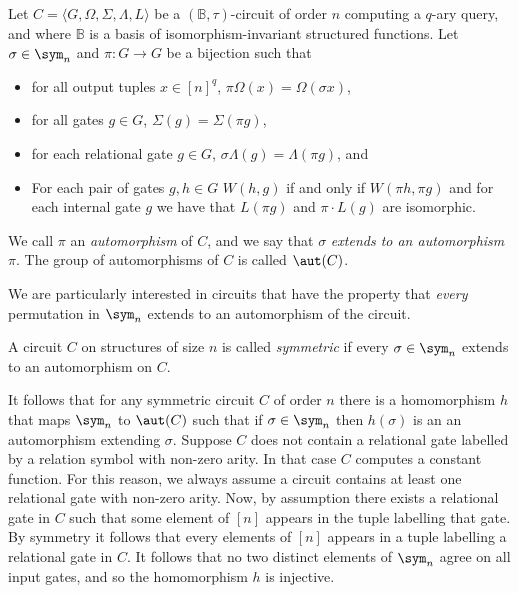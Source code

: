 \documentclass[a4paper,UKenglish]{lipics-v2018}
\begin{document}
\begin{definition}[Automorphism]\label{defn:automorphism}
  Let $C = \langle G, \Omega, \Sigma, \Lambda, L\rangle$ be a
  $(\mathbb{B},\tau)$-circuit of order $n$ computing a $q$-ary query, and where
  $\mathbb{B}$ is a basis of isomorphism-invariant structured functions. Let
  $\sigma \in \sym_n$ and $\pi: G \rightarrow G$ be a bijection such that
  \begin{itemize}
  \item for all output tuples $x \in [n]^q$, $\pi \Omega (x) = \Omega (\sigma
    x)$,
  \item for all gates $g \in G$, $\Sigma (g) = \Sigma (\pi g)$,
  \item for each relational gate $g \in G$, $\sigma \Lambda (g) = \Lambda (\pi
    g)$, and
  \item For each pair of gates $g, h \in G$ $W(h,g)$ if and only if $W(\pi h,
    \pi g)$ and for each internal gate $g$ we have that $L(\pi g)$ and $ \pi
    \cdot L(g)$ are isomorphic.
  \end{itemize}
  We call $\pi$ an \emph{automorphism} of $C$, and we say that $\sigma$
  \emph{extends to an automorphism} $\pi$. The group of automorphisms of $C$ is
  called $\aut (C)$.
\end{definition}

We are particularly interested in circuits that have the property that
\emph{every} permutation in $\sym_n$ extends to an automorphism of the circuit.

\begin{definition}[Symmetry]
  A circuit $C$ on structures of size $n$ is called \emph{symmetric} if every
  $\sigma \in \sym_n$ extends to an automorphism on $C$.
\end{definition}

It follows that for any symmetric circuit $C$ of order $n$ there is a
homomorphism $h$ that maps $\sym_n$ to $\aut(C)$ such that if $\sigma \in
\sym_n$ then $h(\sigma)$ is an an automorphism extending $\sigma$. Suppose $C$
does not contain a relational gate labelled by a relation symbol with non-zero
arity. In that case $C$ computes a constant function. For this reason, we always
assume a circuit contains at least one relational gate with non-zero arity. Now,
by assumption there exists a relational gate in $C$ such that some element of
$[n]$ appears in the tuple labelling that gate. By symmetry it follows that
every elements of $[n]$ appears in a tuple labelling a relational gate in $C$.
It follows that no two distinct elements of $\sym_n$ agree on all input gates,
and so the homomorphism $h$ is injective.
\end{document}
